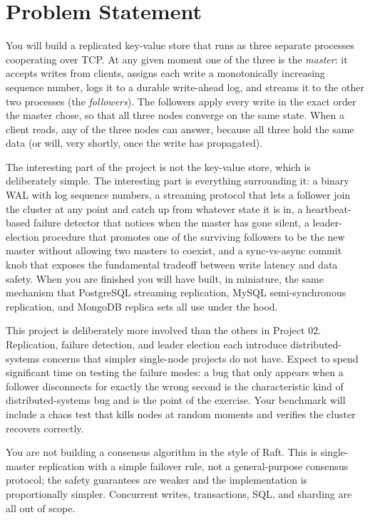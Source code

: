 \documentclass[11pt,a4paper]{article}
\begin{document}

\section{Problem Statement}

You will build a replicated key-value store that runs as three separate processes cooperating over TCP. At any given moment one of the three is the \textit{master}: it accepts writes from clients, assigns each write a monotonically increasing sequence number, logs it to a durable write-ahead log, and streams it to the other two processes (the \textit{followers}). The followers apply every write in the exact order the master chose, so that all three nodes converge on the same state. When a client reads, any of the three nodes can answer, because all three hold the same data (or will, very shortly, once the write has propagated).

The interesting part of the project is not the key-value store, which is deliberately simple. The interesting part is everything surrounding it: a binary WAL with log sequence numbers, a streaming protocol that lets a follower join the cluster at any point and catch up from whatever state it is in, a heartbeat-based failure detector that notices when the master has gone silent, a leader-election procedure that promotes one of the surviving followers to be the new master without allowing two masters to coexist, and a sync-vs-async commit knob that exposes the fundamental tradeoff between write latency and data safety. When you are finished you will have built, in miniature, the same mechanism that PostgreSQL streaming replication, MySQL semi-synchronous replication, and MongoDB replica sets all use under the hood.

This project is deliberately more involved than the others in Project 02. Replication, failure detection, and leader election each introduce distributed-systems concerns that simpler single-node projects do not have. Expect to spend significant time on testing the failure modes: a bug that only appears when a follower disconnects for exactly the wrong second is the characteristic kind of distributed-systems bug and is the point of the exercise. Your benchmark will include a chaos test that kills nodes at random moments and verifies the cluster recovers correctly.

You are not building a consensus algorithm in the style of Raft. This is single-master replication with a simple failover rule, not a general-purpose consensus protocol; the safety guarantees are weaker and the implementation is proportionally simpler. Concurrent writes, transactions, SQL, and sharding are all out of scope.
\end{document}
